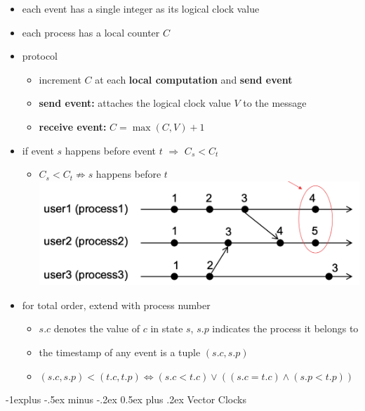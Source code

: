 \documentclass[10pt, landscape]{article}
\makeatletter
\renewcommand{\subsection}{\@startsection{subsection}{2}{0mm}%
  {-1explus -.5ex minus -.2ex}%
  {0.5ex plus .2ex}%
{\normalfont\normalsize\bfseries}}
\makeatother
\begin{document}
\begin{multicols*}{3}
  \begin{itemize}
    \item each event has a single integer as its logical clock value
    \item each process has a local counter $C$
    \item protocol
      \begin{itemize}
        \item increment $C$ at each \textbf{local computation} and \textbf{send event}
        \item \textbf{send event:} attaches the logical clock value $V$ to the message
        \item \textbf{receive event:} $C = \max(C, V)+1$
      \end{itemize}
    \item if event $s$ happens before event $t$ $\Rightarrow$ $C_s < C_t$
      \begin{itemize}
        \item $C_s < C_t \not\Rightarrow s$ happens before $t$
          \includegraphics[width=0.6\linewidth]{cs4231-logical-clocks-happens-before-counterexample.png} 
      \end{itemize}
    \item for total order, extend with process number
      \begin{itemize}
        \item $s.c$ denotes the value of $c$ in state $s$, $s.p$ indicates the process it belongs to
        \item the timestamp of any event is a tuple $(s.c, s.p)$
        \item $(s.c, s.p) < (t.c, t.p) \iff (s.c < t.c) \lor ((s.c = t.c) \land (s.p < t.p))$
      \end{itemize}
  \end{itemize}

  \subsection{Vector Clocks}


\end{multicols*}
\end{document}
